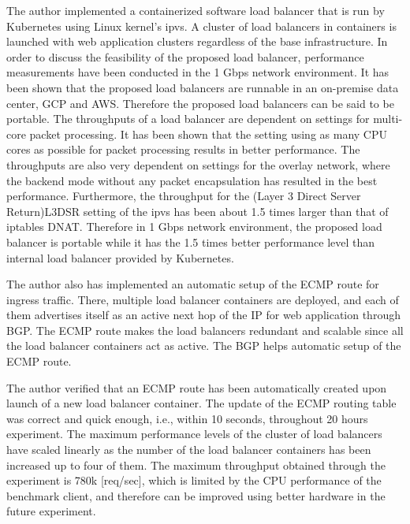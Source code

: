 The author implemented a containerized software load balancer that is run by Kubernetes using Linux kernel's ipvs.
A cluster of load balancers in containers is launched with web application clusters regardless of the base infrastructure.
In order to discuss the feasibility of the proposed load balancer, performance measurements have been conducted in the 1 Gbps network environment.
It has been shown that the proposed load balancers are runnable in an on-premise data center, GCP and AWS.
Therefore the proposed load balancers can be said to be portable.
%
The throughputs of a load balancer are dependent on settings for multi-core packet processing.
It has been shown that the setting using as many CPU cores as possible for packet processing results in better performance.
The throughputs are also very dependent on settings for the overlay network, where the backend mode without any packet encapsulation has resulted in the best performance.
%
Furthermore, the throughput for the (Layer 3 Direct Server Return)L3DSR setting of the ipvs has been about 1.5 times larger than that of iptables DNAT.
Therefore in 1 Gbps network environment, the proposed load balancer is portable while it has the 1.5 times better performance level than internal load balancer provided by Kubernetes.

The author also has implemented an automatic setup of the ECMP route for ingress traffic.
There, multiple load balancer containers are deployed, and each of them advertises itself as an active next hop of the IP for web application through BGP.
The ECMP route makes the load balancers redundant and scalable since all the load balancer containers act as active.
The BGP helps automatic setup of the ECMP route.  


%
The author verified that an ECMP route has been automatically created upon launch of a new load balancer container.
The update of the ECMP routing table was correct and quick enough, i.e., within 10 seconds, throughout 20 hours experiment.
The maximum performance levels of the cluster of load balancers have scaled linearly as the number of the load balancer containers has been increased up to four of them.
The maximum throughput obtained through the experiment is 780k [req/sec], which is limited by the CPU performance of the benchmark client, and therefore can be improved using better hardware in the future experiment.

